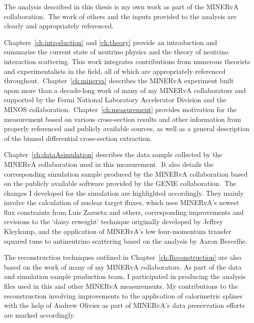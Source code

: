 \cleardoublepage

\begin{declaration}
\vspace{15pt}
The analysis described in this thesis is my own work as part of the MINERvA collaboration.~The work of others and the inputs provided to the analysis are clearly and appropriately referenced. 

Chapters~\ref{ch:introduction} and \ref{ch:theory} provide an introduction and summarise the current state of neutrino physics and the theory of neutrino interaction scattering. This work integrates contributions from numerous theorists and experimentalists in the field, all of which are appropriately referenced throughout.~Chapter~\ref{ch:minerva} describes the MINERvA experiment built upon more than a decade-long work of many of my MINERvA collaborators and supported by the Fermi National Laboratory Accelerator Division and the MINOS collaboration.~Chapter~\ref{ch:measurement} provides motivation for the measurement based on various cross-section results and other information from properly referenced and publicly available sources, as well as a general description of the binned differential cross-section extraction.

Chapter~\ref{ch:dataAsimulation} describes the data sample collected by the MINERvA collaboration used in this measurement.~It also details the corresponding simulation sample produced by the MINERvA collaboration based on the publicly available software provided by the GENIE collaboration.~The changes I developed for the simulation are highlighted accordingly. They mainly involve the calculation of nuclear target fluxes, which uses MINERvA's newest flux constraints from Luis Zazueta and others, corresponding improvements and revisions to the `daisy reweight' technique originally developed by Jeffrey Kleykamp, and the application of MINERvA's low four-momentum transfer squared tune to antineutrino scattering based on the analysis by Aaron Bercellie. 

The reconstruction techniques outlined in Chapter~\ref{ch:Reconstruction} are also based on the work of many of my MINERvA collaborators. As part of the data and simulation sample production team, I participated in producing the analysis files used in this and other MINERvA measurements. My contributions to the reconstruction involving improvements to the application of calorimetric splines with the help of Andrew Olivier as part of MINERvA's data preservation efforts are marked accordingly.


\end{declaration}
